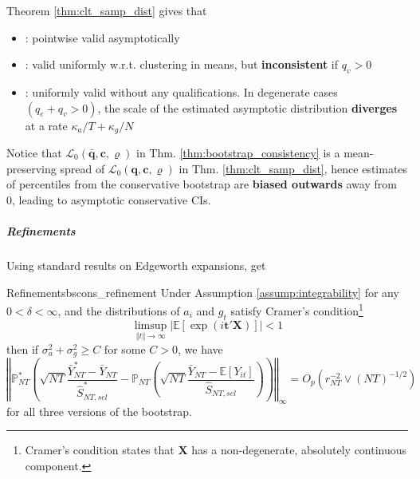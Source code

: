 \documentclass[twoside]{article}
\begin{document}
Theorem \ref{thm:clt_samp_dist} gives that 
\begin{itemize}
    \item {}: pointwise valid asymptotically
    \item {}: valid uniformly w.r.t. clustering in means, but \textbf{inconsistent} if $q_v>0$
    \item {}: uniformly valid without any qualifications. In degenerate cases $\left(q_e+q_v>0\right)$, the scale of the estimated asymptotic distribution \textbf{diverges} at a rate $\kappa_a/T + \kappa_g/N$
\end{itemize}
Notice that $\mathcal{L}_0\left(\bar{\mathbf{q}},\mathbf{c},\varrho\right)$ in Thm. \ref{thm:bootstrap_consistency} is a mean-preserving spread of $\mathcal{L}_0\left( \mathbf{q,c},\varrho\right)$ in Thm. \ref{thm:clt_samp_dist}, hence estimates of percentiles from the conservative bootstrap are \textbf{biased outwards} away from 0,
leading to asymptotic conservative CIs.

\subparagraph*{Refinements} Using standard results on Edgeworth expansions, get
\begin{proposition}{Refinements}{bscons_refinement}
    Under Assumption \ref{assump:integrability} for any $0 < \delta < \infty$, and the distributions of $a_i$ and $g_t$ satisfy Cramer's condition\footnote{Cramer's condition states that $\mathbf{X}$ has a non-degenerate, absolutely continuous component.}
    $$ \limsup_{\left\Vert t \right\Vert \rightarrow \infty} \left\vert \mathbb{E}\left[\exp(i\mathbf{t'X})\right] \right\vert <1 $$
    then if $\sigma^2_a + \sigma^2_g \geq C$ for some $C>0$, we have 
    \begin{equation*}
        \left\Vert \mathbb{P}^*_{NT}\left(\sqrt{NT} \frac{\bar{Y}^*_{NT}-\bar{Y}_{NT}}{\hat{S}^*_{NT,sel}} - \mathbb{P}_{NT}\left(\sqrt{NT}\frac{\bar{Y}_{NT}-\mathbb{E}[Y_{it}]}{\hat{S}_{NT,sel}}\right) \right) \right\Vert _{\infty} = O_p\left(r^{-2}_{NT} \vee (NT)^{-1/2} \right)
    \end{equation*}
    for all three versions of the bootstrap.
\end{proposition}
\end{document}
